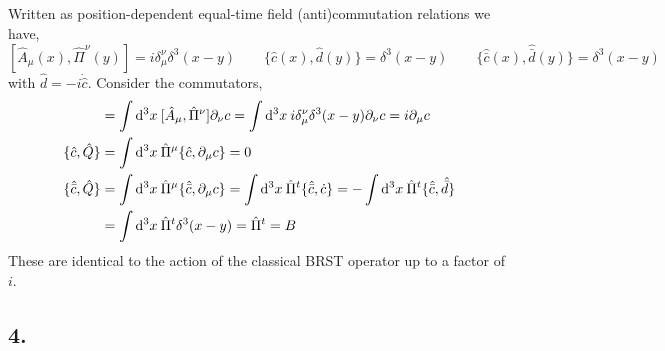 \documentclass[12pt]{article}
\begin{document}
Written as position-dependent equal-time field (anti)commutation relations we have,
\[ \left[ \hat{A}_\mu(x), \hat{\Pi}^\nu(y) \right] = i \delta_\mu^\nu  \delta^3(x - y) \quad  \quad \{ \hat{c}(x), \hat{d}(y) \} =  \delta^3(x - y) \quad \quad  \{ \hat{\bar{c}}(x), \hat{\bar{d}}(y) \} = \delta^3(x - y) \]
with $\hat{d} = -i \dot{\hat{c}}$. 
Consider the commutators,
\begin{align*}
[ \hat{A}_\mu, \hat{Q} ] & = \int \dn{3}{x} [ \hat{A}_\mu, \hat{\Pi}^\nu ] \partial_\nu c = \int \dn{3}{x} i \delta_\mu^\nu \delta^3(x - y) \partial_\nu c = i \partial_\mu c 
\\
\{ \hat{c}, \hat{Q} \} & = \int \dn{3}{x} \hat{\Pi}^\mu \{ \hat{c}, \partial_\mu c \} = 0
\\
\{ \hat{\bar{c}}, \hat{Q} \} & = \int \dn{3}{x} \hat{\Pi}^\mu \{ \hat{\bar{c}}, \partial_\mu c \} = \int \dn{3}{x} \hat{\Pi}^t \{ \hat{\bar{c}}, \dot{c} \} =  - \int \dn{3}{x} \hat{\Pi}^t \{ \hat{\bar{c}}, \hat{\bar{d}} \} 
\\
& = \int \dn{3}{x} \hat{\Pi}^t  \delta^3(x - y) = \hat{\Pi}^t =  B
\end{align*}
These are identical to the action of the classical BRST operator up to a factor of $i$. 

\subsection*{4.}
\end{document}
